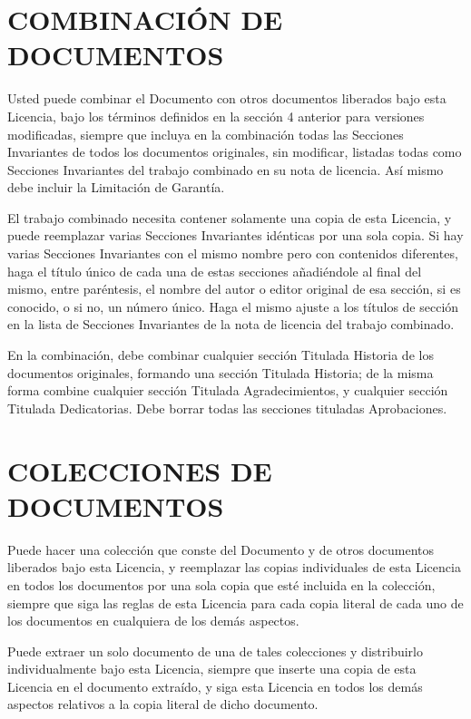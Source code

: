 \documentclass[letterpaper,12pt,titlepage]{article}
\begin{document}
\section{COMBINACIÓN DE DOCUMENTOS}

Usted puede combinar el Documento con otros documentos liberados bajo esta Licencia, bajo los términos definidos en la sección 4 anterior para versiones modificadas, siempre que incluya en la combinación todas las Secciones Invariantes de todos los documentos originales, sin modificar, listadas todas como Secciones Invariantes del trabajo combinado en su nota de licencia. Así mismo debe incluir la Limitación de Garantía.\par

El trabajo combinado necesita contener solamente una copia de esta Licencia, y puede reemplazar varias Secciones Invariantes idénticas por una sola copia. Si hay varias Secciones Invariantes con el mismo nombre pero con contenidos diferentes, haga el título único de cada una de estas secciones añadiéndole al final del mismo, entre paréntesis, el nombre del autor o editor original de esa sección, si es conocido, o si no, un número único. Haga el mismo ajuste a los títulos de sección en la lista de Secciones Invariantes de la nota de licencia del trabajo combinado.\par

En la combinación, debe combinar cualquier sección Titulada Historia de los documentos originales, formando una sección Titulada Historia; de la misma forma combine cualquier sección Titulada Agradecimientos, y cualquier sección Titulada Dedicatorias. Debe borrar todas las secciones tituladas Aprobaciones.\par

\section{COLECCIONES DE DOCUMENTOS}

Puede hacer una colección que conste del Documento y de otros documentos liberados bajo esta Licencia, y reemplazar las copias individuales de esta Licencia en todos los documentos por una sola copia que esté incluida en la colección, siempre que siga las reglas de esta Licencia para cada copia literal de cada uno de los documentos en cualquiera de los demás aspectos.\par

Puede extraer un solo documento de una de tales colecciones y distribuirlo individualmente bajo esta Licencia, siempre que inserte una copia de esta Licencia en el documento extraído, y siga esta Licencia en todos los demás aspectos relativos a la copia literal de dicho documento.\par
\end{document}
